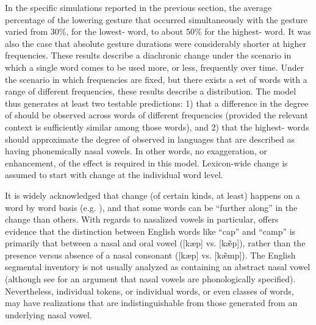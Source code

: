 In the specific simulations reported in the previous section, the
average percentage of the  lowering gesture that occurred simultaneously
with the  gesture varied from 30\%, for the lowest-
word, to about 50\% for the highest- word. It was also the
case that absolute gesture durations were considerably shorter
at higher frequencies. These results describe a diachronic change
under the scenario in which a single word comes to be used more, or
less, frequently over time. Under the scenario in which frequencies
are fixed, but there exists a set of words with a range of different
frequencies, these results describe a  distribution. The
model thus generates at least two testable predictions: 1) that a
difference in the degree of  should be observed
across words of different frequencies (provided the relevant 
context is sufficiently similar among those words), and 2) that the
highest- words should approximate the degree of 
observed in languages that are described as having phonemically nasal
vowels. In other words, no exaggeration, or enhancement, of the effect
is required in this model. Lexicon-wide change is assumed to start
with change at the individual word level.

It is widely acknowledged that change (of certain kinds, at least)
happens on a word by word basis (e.g. \citealt{Phillips1984,Bybee2002,Pierrehumbert2002}),
and that some words can be ``further along'' in the change than others.
With regards to nasalized vowels in particular, \citet{malecot1960vowel}
offers evidence that the distinction between English words like “cap”
and “camp” is primarily that between a nasal and oral vowel
({[kæp]} vs. {[kæ̃p]}), rather than the presence
versus absence of a nasal consonant ({[kæp]} vs. {[kæ̃mp]}).
The English segmental inventory is not usually analyzed as containing
an abstract nasal vowel (although see \citealt{Sole1992} for an argument
that nasal vowels are phonologically specified). Nevertheless, individual
tokens, or individual words, or even classes of words, may have 
realizations that are indistinguishable from those generated from
an underlying nasal vowel. 
